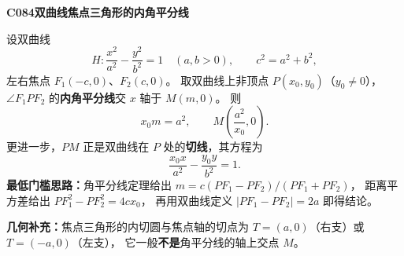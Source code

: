 \textbf{C084\quad 双曲线焦点三角形的内角平分线}

设双曲线
\[
H:\frac{x^2}{a^2}-\frac{y^2}{b^2}=1\quad(a,b>0),
\qquad c^2=a^2+b^2,
\]
左右焦点 $F_1(-c,0)$、$F_2(c,0)$。
取双曲线上非顶点 $P(x_0,y_0)$（$y_0\ne0$），
$\angle F_1PF_2$ 的\textbf{内角平分线}交 $x$ 轴于 $M(m,0)$。
则
\[
\boxed{x_0m=a^2,\qquad M\left(\frac{a^2}{x_0},0\right)}.
\]
更进一步，$PM$ 正是双曲线在 $P$ 处的\textbf{切线}，其方程为
\[
\boxed{\frac{x_0x}{a^2}-\frac{y_0y}{b^2}=1}.
\]
\textbf{最低门槛思路：}角平分线定理给出
$m=c(PF_1-PF_2)/(PF_1+PF_2)$，
距离平方差给出 $PF_1^2-PF_2^2=4cx_0$，
再用双曲线定义 $|PF_1-PF_2|=2a$ 即得结论。

\textbf{几何补充：}焦点三角形的内切圆与焦点轴的切点为
$T=(a,0)$（右支）或 $T=(-a,0)$（左支），
它一般\textbf{不是}角平分线的轴上交点 $M$。
